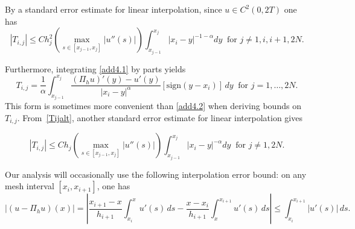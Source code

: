 \documentclass[smallextended]{svjour3}       %
\begin{document}
By a standard error estimate for linear interpolation, since $u\in C^2(0,2T)$  one has
\begin{equation}\label{add4.2}
	\left|T_{i,j} \right| \leq  C h_{j}^{2}   \left(\max_{s\in[x_{j-1}, x_{j}]} \left| u''(s)\right|\right)
	\int_{x_{j-1}}^{x_{j}}  \left| x_{i}-y \right|^{-1-\alpha} dy
	\ \text{ for }j\ne 1,i, i+1,2N.
\end{equation}

Furthermore, integrating \eqref{add4.1} by parts yields
\begin{equation}\label{Tijalt}
	T_{i,j}
	= \frac1{\alpha}\int_{x_{j-1}}^{x_{j}}{\frac{(\Pi_h u)'(y)-u'(y)}{| x_i-y |^{\alpha } }
		[\text{sign}(y-x_i)]\,dy}\ \text{ for } j=1,\dots, 2N.
\end{equation}
This form is sometimes more convenient than \eqref{add4.2} when deriving bounds on $T_{i,j}$.
From~\eqref{Tijalt}, another standard error estimate for linear interpolation   gives

\begin{equation}\label{Tij2}
	\left|T_{i,j} \right| \leq  C h_{j} \left( \max_{s\in[x_{j-1}, x_{j}]} \left| u''(s) \right|\right)
	\int_{x_{j-1}}^{x_{j}}  \left| x_{i}-y \right|^{-\alpha} dy
	\ \text{ for }j\ne 1, 2N.
\end{equation}

Our analysis will occasionally use the following interpolation error bound: on any mesh interval 
$[x_i, x_{i+1}]$, one has 
\begin{equation}\label{interp}
|(u-\Pi_hu)(x)| = \left|\frac{x_{i+1}-x}{h_{i+1}} \int_{x_i}^x u'(s)\,ds -  \frac{x-x_i}{h_{i+1}} \int_x^{x_{i+1}} u'(s)\,ds \right|
	\le \int_{x_i}^{x_{i+1}}  |u'(s)|\,ds.
\end{equation}
\end{document}
